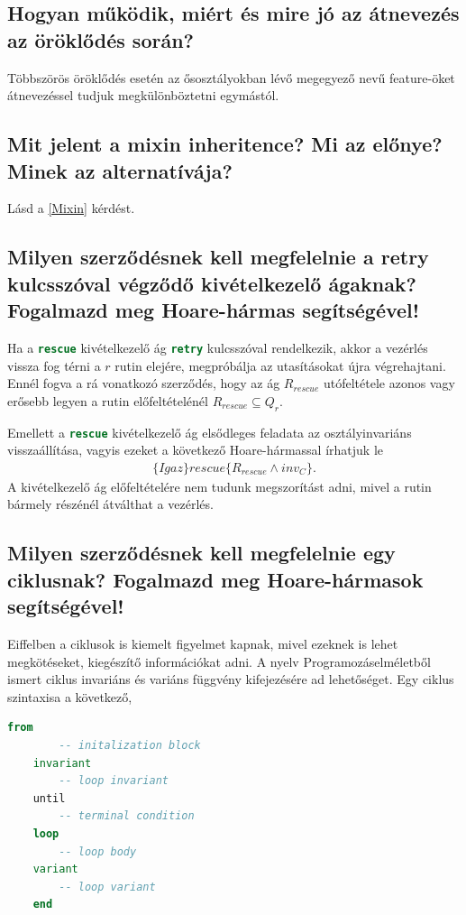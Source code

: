 \subsection{ Hogyan működik, miért és mire jó az átnevezés az öröklődés során? }\label{atnevezes}
	Többszörös öröklődés esetén az ősosztályokban lévő megegyező nevű feature-öket átnevezéssel tudjuk megkülönböztetni egymástól.

\subsection{ Mit jelent a mixin inheritence? Mi az előnye? Minek az alternatívája? }
	Lásd a \ref{Mixin} kérdést.
	
\subsection{ Milyen szerződésnek kell megfelelnie a retry kulcsszóval végződő kivételkezelő ágaknak? Fogalmazd meg Hoare-hármas segítségével! }
	Ha a \lstinline[language=Eiffel]|rescue| kivételkezelő ág \lstinline[language=Eiffel]|retry| kulcsszóval rendelkezik, akkor a vezérlés vissza fog térni a $r$ rutin elejére, megpróbálja az utasításokat újra végrehajtani. Ennél fogva a rá vonatkozó szerződés, hogy az ág $R_{rescue}$ utófeltétele azonos vagy erősebb legyen a rutin előfeltételénél $R_{rescue} \subseteq Q_r$. 
	
	Emellett a \lstinline[language=Eiffel]|rescue| kivételkezelő ág elsődleges feladata az osztályinvariáns visszaállítása, vagyis ezeket a következő Hoare-hármassal írhatjuk le 
	\begin{align*}
	\{Igaz\} rescue \{R_{rescue}\wedge inv_C\}.
	\end{align*}
	A kivételkezelő ág előfeltételére nem tudunk megszorítást adni, mivel a rutin bármely részénél átválthat a vezérlés.
	
\subsection{ Milyen szerződésnek kell megfelelnie egy ciklusnak? Fogalmazd meg Hoare-hármasok segítségével! }
	Eiffelben a ciklusok is kiemelt figyelmet kapnak, mivel ezeknek is lehet megkötéseket, kiegészítő információkat adni. A nyelv Programozáselméletből ismert ciklus invariáns és variáns függvény kifejezésére ad lehetőséget. Egy ciklus szintaxisa a következő,
	\begin{lstlisting}[language=Eiffel]
	from
		-- initalization block
	invariant
		-- loop invariant
	until
		-- terminal condition
	loop
		-- loop body
	variant
		-- loop variant
	end
	\end{lstlisting}
	

